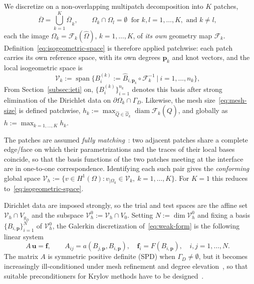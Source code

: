 \documentclass{article}
\newcommand{\vect}[1]{\boldsymbol{#1}}
\DeclareMathOperator{\spann}{span}
\newcommand{\npatch}{K} %
\newcommand{\refdom}{\widehat{\Omega}}            %
\newcommand{\patchdom}[1]{\Omega_{#1}}            %
\newcommand{\Bref}[2]{\widehat{B}_{#1,#2}}       %
\newcommand{\Bphy}[2]{B_{#1,#2}}                  %
\newcommand{\Bloc}[2]{B^{(#1)}_{#2}}              %
\newcommand{\Vglo}{\mathcal{V}_h}                  %
\newcommand{\Vloc}[1]{\mathcal{V}_{#1}}            %
\newcommand{\gmapk}[1]{\mathcal{F}_{#1}}         %
\newcommand{\Aglo}{A}                             %
\newcommand{\fglo}{\vect{f}}                      %
\newcommand{\uglo}{\vect{u}}                      %
\theoremstyle{plain}
\numberwithin{equation}{section}
\begin{document}
We discretize on a non-overlapping multipatch decomposition into $\npatch$
patches,
\begin{equation}
    \overline{\Omega} = \bigcup_{k=1}^{\npatch} \overline{\patchdom{}}_{k},
    \qquad \patchdom{k} \cap \patchdom{l} = \emptyset \ \text{ for } k,l = 1, \ldots, \npatch, \text{ and } k \neq l,
    \label{eq:multipatch}
\end{equation}
each the image $\patchdom{k} = \gmapk{k}(\refdom)$, $k = 1, \ldots, \npatch$, of
\emph{its own} geometry map $\gmapk{k}$.  Definition~\eqref{eq:isogeometric-space}
is therefore applied patchwise: each patch carries its own reference space, with
its own degrees $\vect{p}_k$ and knot vectors, and the local isogeometric space is
\begin{equation}
    \Vloc{k} := \spann\bigl\{ \Bloc{k}{i} := \Bref{i}{\vect{p}_k} \circ
    \gmapk{k}^{-1} \ \big|\ i = 1, \dots, n_k \bigr\},
    \label{eq:local-space}
\end{equation}
From Section~\ref{subsec:ieti} on,
$\{\Bloc{k}{i}\}_{i=1}^{n_k}$ denotes this basis after strong elimination of the
Dirichlet data on $\partial\patchdom{k} \cap \Gamma_D$.  Likewise, the mesh
size~\eqref{eq:mesh-size} is defined patchwise, $h_k := \max_{\widehat{Q} \in
        \widehat{\mathcal{Q}}_k} \operatorname{diam}\gmapk{k}(\widehat{Q})$, and
globally as $h := \max_{k=1,\dots,\npatch} h_k$.

The patches are assumed \emph{fully matching}~\cite{kleiss2012ieti}: two adjacent
patches share a complete edge/face on which their parametrizations and the traces
of their local bases coincide, so that the basis functions of the two patches
meeting at the interface are in one-to-one correspondence.  Identifying each such
pair gives the \emph{conforming} global space $\Vglo := \{ v \in H^1(\Omega) : v_{|\patchdom{k}} \in \Vloc{k},
    \ k=1, \ldots, \npatch \}$.
For $\npatch = 1$ this reduces to~\eqref{eq:isogeometric-space}.

Dirichlet data are imposed strongly, so the trial and test spaces are the affine
set $\Vglo \cap V_{g_D}$ and the subspace $\Vglo^0 := \Vglo \cap V_0$.  Setting
$N := \dim \Vglo^0$ and fixing a basis $\{\Bphy{i}{\vect{p}}\}_{i=1}^{N}$ of
$\Vglo^0$, the
Galerkin discretization of~\eqref{eq:weak-form} is the following linear system
\begin{equation}
    \Aglo\, \uglo = \fglo, \qquad
    \Aglo_{ij} = a(\Bphy{j}{\vect{p}}, \Bphy{i}{\vect{p}}), \quad
    \fglo_i = F(\Bphy{i}{\vect{p}}), \quad i, j = 1, \dots, N.
    \label{eq:global-system}
\end{equation}
The matrix $\Aglo$ is symmetric positive definite (SPD) when $\Gamma_D \neq \emptyset$, but it becomes
increasingly ill-conditioned under mesh refinement and
degree elevation~\cite{gahalaut2019condition, sangalli2016isogeometric}, so that
suitable preconditioners for Krylov methods have to be
designed~\cite{van2003iterative}.
\end{document}
